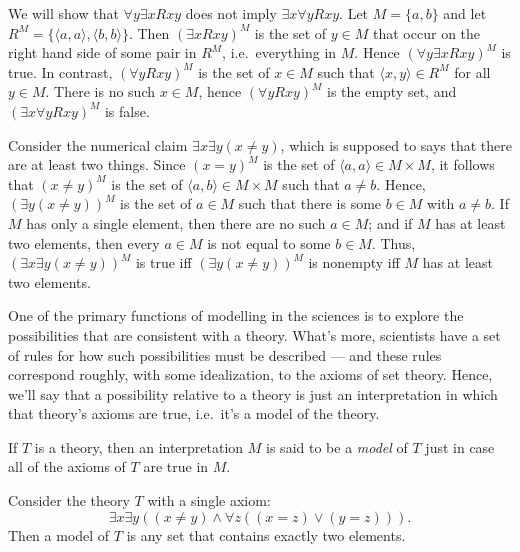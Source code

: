 \begin{example} We will show that $\forall y\exists xRxy$ does not
   imply $\exists x\forall yRxy$.  Let $M=\{ a,b\}$ and let
   $R^M=\{ \langle a,a\rangle ,\langle b,b\rangle \}$.  Then
   $(\exists xRxy)^M$ is the set of $y\in M$ that occur on the right
   hand side of some pair in $R^M$, i.e.\ everything in $M$.  Hence
   $(\forall y\exists xRxy)^M$ is true.  In contrast,
   $(\forall yRxy)^M$ is the set of $x\in M$ such that
   $\langle x,y\rangle\in R^M$ for all $y\in M$.  There is no such
   $x\in M$, hence $(\forall yRxy)^M$ is the empty set, and
   $(\exists x\forall yRxy)^M$ is false. \end{example}

 \begin{example} Consider the numerical claim
   $\exists x\exists y(x\neq y)$, which is supposed to says that there
   are at least two things.  Since $(x=y)^M$ is the set of
   $\langle a,a\rangle \in M\times M$, it follows that $(x\neq y)^M$
   is the set of $\langle a,b\rangle \in M\times M$ such that
   $a\neq b$.  Hence, $(\exists y(x\neq y))^M$ is the set of $a\in M$
   such that there is some $b\in M$ with $a\neq b$.  If $M$ has only a
   single element, then there are no such $a\in M$; and if $M$ has at
   least two elements, then every $a\in M$ is not equal to some
   $b\in M$.  Thus, $(\exists x\exists y (x\neq y))^M$ is true iff
   $(\exists y(x\neq y))^M$ is nonempty iff $M$ has at least two
   elements. \end{example}

 One of the primary functions of modelling in the sciences is to
 explore the possibilities that are consistent with a theory.  What's
 more, scientists have a set of rules for how such possibilities must
 be described --- and these rules correspond roughly, with some
 idealization, to the axioms of set theory.  Hence, we'll say that a
 possibility relative to a theory is just an interpretation in which
 that theory's axioms are true, i.e.\ it's a model of the theory.


\begin{defn} If $T$ is a theory, then an interpretation $M$ is said to
  be a \emph{\gls{model}} of $T$ just in case all of the axioms of $T$
  are true in $M$. \end{defn}

\begin{example} Consider the theory $T$ with a single axiom:
  \[ \exists x\exists y\left( (x\neq y)\wedge \forall z((x=z)\vee (y=z))
      \right) . \]  Then a model of $T$ is any set that
  contains exactly two elements. \end{example}    

